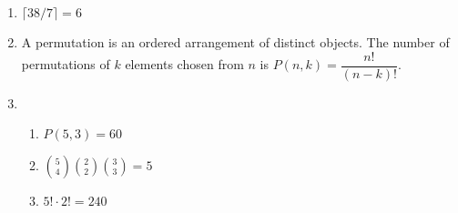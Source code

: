 \documentclass{article}
\begin{document}
\begin{enumerate}
\begin{enumerate}
    \end{enumerate}
    \item $\lceil 38/7 \rceil = 6$
    \item A permutation is an ordered arrangement of distinct objects. The number of permutations of $k$ elements chosen from $n$ is $P(n,k) = \dfrac{n!}{(n-k)!}$.
    \item \begin{enumerate}
        \item $P(5,3) = 60$
        \item $\binom{5}{4}\binom{2}{2}\binom{3}{3} = 5$
        \item $5! \cdot 2! = 240$
    \end{enumerate}
\end{enumerate}
\end{document}
